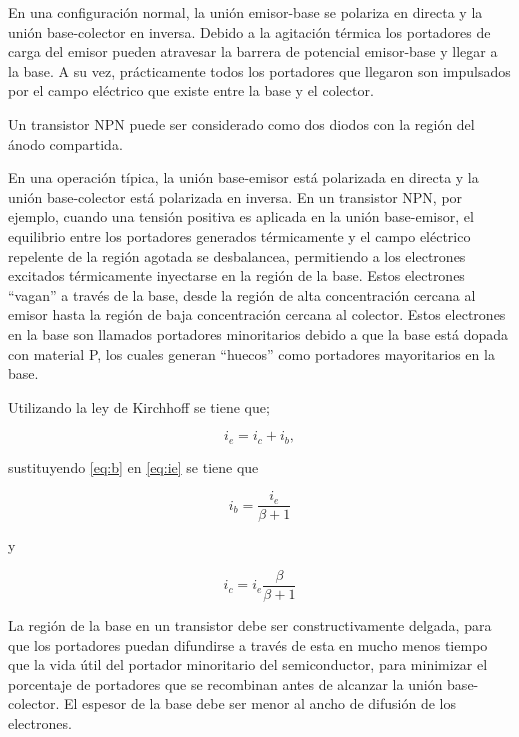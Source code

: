 \documentclass{article}
\begin{document}
En una configuración normal, la unión emisor-base se polariza en directa
y la unión base-colector en inversa. Debido a la agitación térmica los
portadores de carga del emisor pueden atravesar la barrera de potencial
emisor-base y llegar a la base. A su vez, prácticamente todos los
portadores que llegaron son impulsados por el campo eléctrico que existe
entre la base y el colector.

Un transistor NPN puede ser considerado como dos diodos con la región
del ánodo compartida.

En una operación típica, la unión base-emisor está polarizada en directa
y la unión base-colector está polarizada en inversa. En un transistor
NPN, por ejemplo, cuando una tensión positiva es aplicada en la unión
base-emisor, el equilibrio entre los portadores generados térmicamente y
el campo eléctrico repelente de la región agotada se desbalancea,
permitiendo a los electrones excitados térmicamente inyectarse en la
región de la base. Estos electrones ``vagan'' a través de la base, desde
la región de alta concentración cercana al emisor hasta la región de
baja concentración cercana al colector. Estos electrones en la base son
llamados portadores minoritarios debido a que la base está dopada con
material P, los cuales generan ``huecos'' como portadores mayoritarios
en la base.

Utilizando la ley de Kirchhoff se tiene que;

\begin{equation}\label{eq:ie}
i_{e}=i_{c}+i_{b},
\end{equation}

sustituyendo \eqref{eq:b} en \eqref{eq:ie} se tiene que

\begin{equation}
i_{b}= \frac{i_{e}}{\beta +1}
\end{equation}

y

\begin{equation}
i_{c}= i_{e}\frac{\beta}{\beta +1}
\end{equation}

La región de la base en un transistor debe ser constructivamente
delgada, para que los portadores puedan difundirse a través de esta en
mucho menos tiempo que la vida útil del portador minoritario del
semiconductor, para minimizar el porcentaje de portadores que se
recombinan antes de alcanzar la unión base-colector. El espesor de la
base debe ser menor al ancho de difusión de los electrones.
\end{document}
